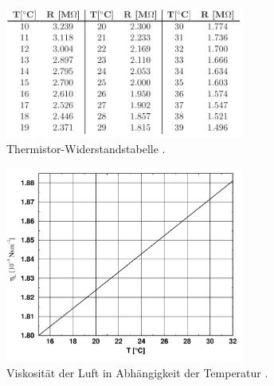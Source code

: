 \label{sec:Anhang}

\begin{figure}
    \centering
    \includegraphics[width=0.7\textwidth]{bilder/thermistorwiderstand.png}
    \caption{Thermistor-Widerstandstabelle \cite{sample}.}
    \label{fig:thermistor}
\end{figure}

\begin{figure}
    \centering
    \includegraphics[width=0.7\textwidth]{bilder/viskositaet.png}
    \caption{Viskosität der Luft in Abhängigkeit der Temperatur \cite{sample}.}
    \label{fig:viskositaet}
\end{figure}

